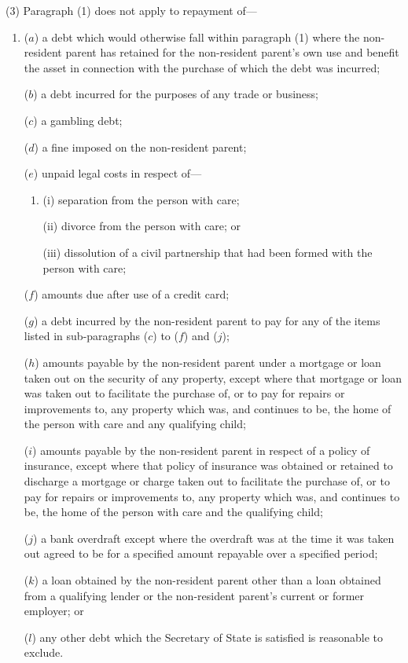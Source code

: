 \documentclass[12pt,a4paper]{article}
\begin{document}
(3) Paragraph (1) does not apply to repayment of—
\begin{enumerate}\item[]
($a$) a debt which would otherwise fall within paragraph (1) where the non-resident parent has retained for the non-resident parent’s own use and benefit the asset in connection with the purchase of which the debt was incurred;

($b$) a debt incurred for the purposes of any trade or business;

($c$) a gambling debt;

($d$) a fine imposed on the non-resident parent;

($e$) unpaid legal costs in respect of—
\begin{enumerate}\item[]
(i) separation from the person with care;

(ii) divorce from the person with care; or

(iii) dissolution of a civil partnership that had been formed with the person with care;
\end{enumerate}

($f$) amounts due after use of a credit card;

($g$) a debt incurred by the non-resident parent to pay for any of the items listed in sub-paragraphs ($c$)  to ($f$)  and ($j$);

($h$) amounts payable by the non-resident parent under a mortgage or loan taken out on the security of any property, except where that mortgage or loan was taken out to facilitate the purchase of, or to pay for repairs or improvements to, any property which was, and continues to be, the home of the person with care and any qualifying child;

($i$) amounts payable by the non-resident parent in respect of a policy of insurance, except where that policy of insurance was obtained or retained to discharge a mortgage or charge taken out to facilitate the purchase of, or to pay for repairs or improvements to, any property which was, and continues to be, the home of the person with care and the qualifying child;

($j$) a bank overdraft except where the overdraft was at the time it was taken out agreed to be for a specified amount repayable over a specified period;

($k$) a loan obtained by the non-resident parent other than a loan obtained from a qualifying lender or the non-resident parent’s current or former employer; or

($l$) any other debt which the Secretary of State is satisfied is reasonable to exclude.
\end{enumerate}
\end{document}
